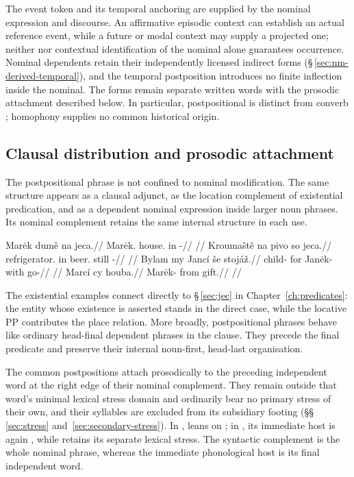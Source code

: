 The event token and its temporal anchoring are supplied by the nominal
expression and discourse. An affirmative episodic context can establish an
actual reference event, while a future or modal context may supply a projected
one; neither  nor contextual identification of the nominal alone
guarantees occurrence.
Nominal dependents retain their independently licensed indirect forms
(§\,\ref{sec:nm-derived-temporal}), and the temporal postposition introduces
no finite inflection inside the nominal. The forms remain separate written
words with the prosodic attachment described below. In particular,
postpositional  is distinct from converb ; homophony supplies
no common historical origin.

\subsection{Clausal distribution and prosodic attachment}
\label{sec:nm-postp-clausal}
\label{sec:nm-postp-status}

The postpositional phrase is not confined to nominal modification. The same
structure appears as a clausal adjunct, as the location complement of
existential predication, and as a dependent nominal expression inside larger
noun phrases. Its nominal complement retains the same internal structure in each use.

\pex
\a
\begingl
\gla Marėk dumě na jeca.//
\glb Marėk.\Dir{} house.\Ind{} in \Exst{}-\Cont{}//
\glft {}//
\endgl
\a
\begingl
\gla Kroumaště na pivo so jeca.//
\glb refrigerator.\Ind{} in beer.\Dir{} still \Exst{}-\Cont{}//
\glft {}//
\endgl
\a
\begingl
\gla Bylam my Jancí še stojáž.//
\glb child-\Ind{} for Janėk-\Ind{} with go-\Ctpl{}//
\glft {}//
\endgl
\a
\begingl
\gla Marcí cy houba.//
\glb Marėk-\Ind{} from gift.\Dir{}//
\glft {}//
\endgl
\xe

\noindent The existential examples connect directly to §\,\ref{sec:jec} in
Chapter~\ref{ch:predicates}: the entity whose existence is asserted stands in the
direct case, while the locative PP contributes the place relation. More broadly,
postpositional phrases behave like ordinary head-final dependent phrases in the
clause. They precede the final predicate and preserve their internal noun-first,
head-last organisation.

The common postpositions attach prosodically to the preceding independent word
at the right edge of their nominal complement. They remain outside that word's
minimal lexical stress domain and ordinarily bear no primary stress of their
own, and their syllables are excluded from its subsidiary footing
(§§\,\ref{sec:stress} and~\ref{sec:secondary-stress}). In ,
 leans on ; in , its immediate host is again
, while  retains its separate lexical stress. The
syntactic complement is the whole nominal phrase, whereas the immediate
phonological host is its final independent word.

